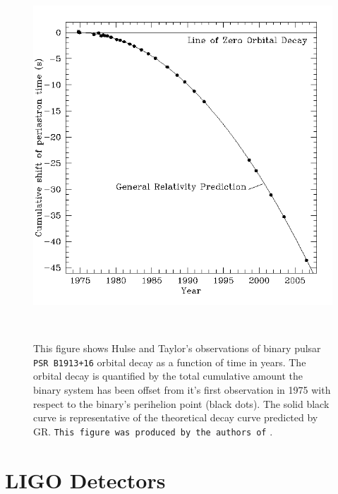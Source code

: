 \begin{figure}
    \centering
    \includegraphics[width=\linewidth]{figures/Hulse_taylor_pulsar.png}
    \caption[Hulse-Taylor binary pulsar decay.]{This figure shows Hulse 
    and Taylor's observations of binary pulsar \texttt{PSR B1913+16} 
    orbital decay as a function of time in years. The orbital decay is quantified by the total cumulative amount the binary system has been offset from it's first observation in 1975 with respect to the binary's perihelion point (black dots). The solid black curve is representative of the theoretical decay curve predicted by \ac{GR}. \texttt{This figure was produced by the authors of} \cite{1975ApJ...195L..51H}. }~
    \label{fig:hulse_taylor_decay}
\end{figure}


\section{LIGO Detectors~}

